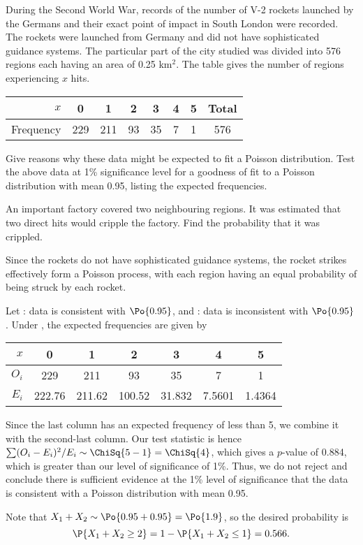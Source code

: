 \begin{problem}
    During the Second World War, records of the number of V-2 rockets launched by the Germans and their exact point of impact in South London were recorded. The rockets were launched from Germany and did not have sophisticated guidance systems. The particular part of the city studied was divided into 576 regions each having an area of 0.25 km$^2$. The table gives the number of regions experiencing $x$ hits.

    \begin{table}[H]
        \centering
        \begin{tabular}{|r|c|c|c|c|c|c|c|}
        \hline
        $x$ & 0 & 1 & 2 & 3 & 4 & 5 & Total \\ \hline
        Frequency & 229 & 211 & 93 & 35 & 7 & 1 & 576 \\ \hline
        \end{tabular}
    \end{table}

    Give reasons why these data might be expected to fit a Poisson distribution. Test the above data at 1\% significance level for a goodness of fit to a Poisson distribution with mean 0.95, listing the expected frequencies.

    An important factory covered two neighbouring regions. It was estimated that two direct hits would cripple the factory. Find the probability that it was crippled.
\end{problem}
\begin{solution}
    Since the rockets do not have sophisticated guidance systems, the rocket strikes effectively form a Poisson process, with each region having an equal probability of being struck by each rocket.

    Let \nullhyp: data is consistent with $\Po{0.95}$, and \althyp: data is inconsistent with $\Po{0.95}$. Under \nullhyp, the expected frequencies are given by 
    \begin{table}[H]
        \centering
        \begin{tabular}{|r|c|c|c|c|c|c|}
        \hline
        $x$ & 0 & 1 & 2 & 3 & 4 & 5 \\ \hline
        $O_i$ & 229 & 211 & 93 & 35 & 7 & 1 \\ \hline
        $E_i$ & 222.76 & 211.62 & 100.52 & 31.832 & 7.5601 & 1.4364 \\ \hline
        \end{tabular}
    \end{table}
    Since the last column has an expected frequency of less than 5, we combine it with the second-last column. Our test statistic is hence $\sum (O_i - E_i)^2/E_i \sim \ChiSq{5-1} = \ChiSq{4}$, which gives a $p$-value of 0.884, which is greater than our level of significance of 1\%. Thus, we do not reject \nullhyp{} and conclude there is sufficient evidence at the 1\% level of significance that the data is consistent with a Poisson distribution with mean 0.95.

    Note that $X_1 + X_2 \sim \Po{0.95 + 0.95} = \Po{1.9}$, so the desired probability is \[\P{X_1 + X_2 \geq 2} = 1 - \P{X_1 + X_2 \leq 1} = 0.566.\]
\end{solution}

